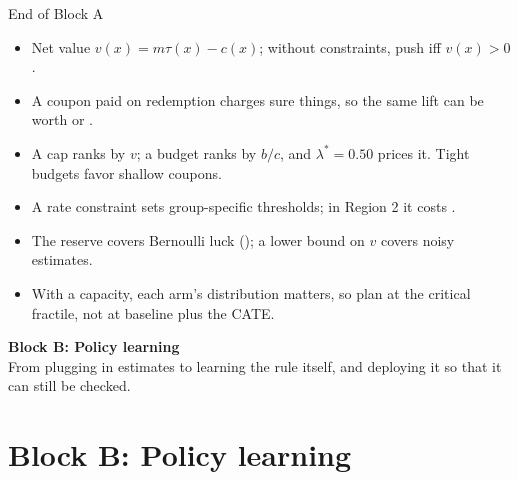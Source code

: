 \documentclass[aspectratio=169, 11pt, handout]{beamer}
\begin{document}
\begin{frame}{End of Block A}

\begin{itemize}
  \item Net value $v(x) = m\tau(x) - c(x)$; without constraints, push iff $v(x) > 0$.
  \item A coupon paid on redemption charges sure things, so the same lift can be worth  or .
  \item A cap ranks by $v$; a budget ranks by $b/c$, and $\lambda^\ast = 0.50$ prices it. Tight budgets favor shallow coupons.
  \item A rate constraint sets group-specific thresholds; in Region 2 it costs .
  \item The reserve covers Bernoulli luck (); a lower bound on $v$ covers noisy estimates.
  \item With a capacity, each arm's distribution matters, so plan at the critical fractile, not at baseline plus the CATE.
\end{itemize}

\vfill

\begin{center}
\Large \textbf{Block B: Policy learning}\\[0.4em]
\normalsize From plugging in estimates to learning the rule itself, and deploying it so that it can still be checked.
\end{center}
\vfill
\end{frame}

\section{Block B: Policy learning}
\end{document}
